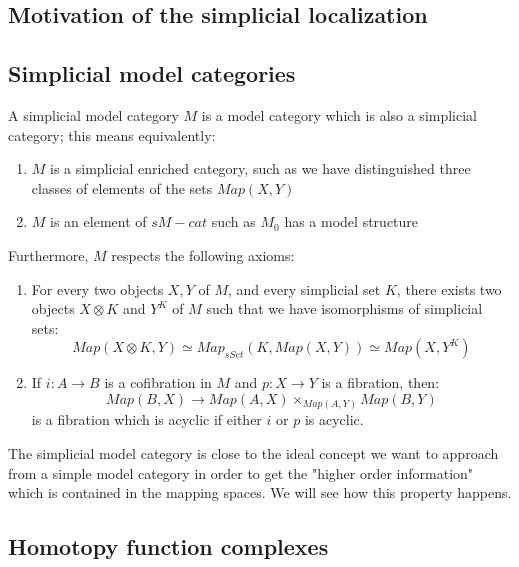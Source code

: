 \begin{refsection}
\section{Motivation of the simplicial localization}

\subsection{Simplicial model categories}

\begin{defin}
A simplicial model category $M$ is a model category which is also a simplicial category; this means equivalently:
\begin{enumerate}
\item $M$ is a simplicial enriched category, such as we have distinguished three classes of elements of the sets $Map(X,Y)$
\item $M$ is an element of $sM-cat$ such as $M_0$ has a model structure
\end{enumerate}
Furthermore, $M$ respects the following axioms:
\begin{enumerate}
\item For every two objects $X, Y$ of $M$, and every simplicial set $K$, there exists two objects $X\otimes K$ and $Y^K$ of $M$ such that we have isomorphisms of simplicial sets:
\begin{equation}
Map(X\otimes K, Y) \simeq Map_{sSet}(K, Map(X,Y)) \simeq Map(X, Y^K)
\end{equation}
\item If $i: A\rightarrow B$ is a cofibration in $M$ and $p:X \rightarrow Y$ is a fibration, then:
\begin{equation}
Map(B,X) \rightarrow Map(A,X) \times_{Map(A,Y)} Map(B,Y)
\end{equation}
is a fibration which is acyclic if either $i$ or $p$ is acyclic.
\end{enumerate}
\end{defin}

The simplicial model category is close to the ideal concept we want to approach from a simple model category in order to get the "higher order information" which is contained in the mapping spaces. We will see how this property happens.

\subsection{Homotopy function complexes}


\end{refsection}
